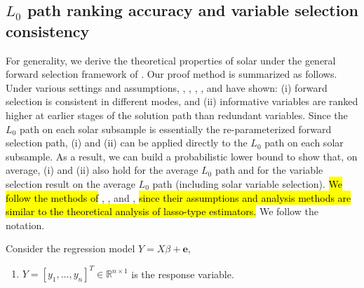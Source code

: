 \documentclass[11pt,review,authoryear]{elsarticle}
\begin{document}
\clearpage
\begin{appendices}
\section{$L_0$ path ranking accuracy and variable selection consistency}

For generality, we derive the theoretical properties of solar under the general forward selection framework of \citet[Figure~1]{zhang09}. Our proof method is summarized as follows. Under various settings and assumptions, \citet{tropp2004greed}, \citet{yuan2007non}, \citet{wainwright2009sharp}, \citet{zhang09}, and \citet{ing2011stepwise} have shown: (i) forward selection is consistent in different modes, and (ii) informative variables are ranked higher at earlier stages of the solution path than redundant variables. Since the $L_0$ path on each solar subsample is essentially the re-parameterized forward selection path, (i) and (ii) can be applied directly to the $L_0$ path on each solar subsample. As a result, we can build a probabilistic lower bound to show that, on average, (i) and (ii) also hold for the average $L_0$ path and for the variable selection result on the average $L_0$ path (including solar variable selection). \hl{We follow the methods of} \citet{tropp2004greed}, \citet{wainwright2009sharp}, and \citet{zhang09}, \hl{since their assumptions and analysis methods are similar to the theoretical analysis of lasso-type estimators.} We follow the \citet{zhang09} notation.

\begin{definition}
  Consider the regression model $Y = X\beta + \mathbf{e}$, \label{def:notation}
\end{definition}
%
\begin{enumerate}
  \item     $Y = \left[ y_1, \ldots, y_n \right]^T \in \mathbb{R}^{n \times 1}$ is the response variable.


\end{enumerate}
\end{appendices}
\end{document}
